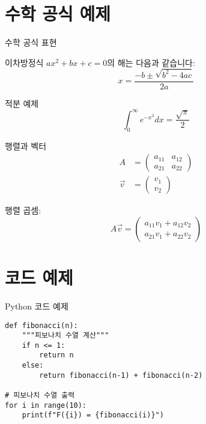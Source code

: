 \documentclass[aspectratio=169]{beamer}
\begin{document}
\section{수학 공식 예제}

\begin{frame}{수학 공식 표현}
    \begin{block}{이차방정식}
        $ax^2 + bx + c = 0$의 해는 다음과 같습니다:
        \[x = \frac{-b \pm \sqrt{b^2 - 4ac}}{2a}\]
    \end{block}
    
    \pause
    
    \begin{block}{적분 예제}
        \[\int_{0}^{\infty} e^{-x^2} dx = \frac{\sqrt{\pi}}{2}\]
    \end{block}
\end{frame}

\begin{frame}{행렬과 벡터}
    \begin{align}
        A &= \begin{pmatrix}
            a_{11} & a_{12} \\
            a_{21} & a_{22}
        \end{pmatrix} \\
        \vec{v} &= \begin{pmatrix}
            v_1 \\
            v_2
        \end{pmatrix}
    \end{align}
    
    \pause
    
    행렬 곱셈:
    \[A\vec{v} = \begin{pmatrix}
        a_{11}v_1 + a_{12}v_2 \\
        a_{21}v_1 + a_{22}v_2
    \end{pmatrix}\]
\end{frame}

\section{코드 예제}

\begin{frame}[fragile]{Python 코드 예제}
    \begin{lstlisting}
def fibonacci(n):
    """피보나치 수열 계산"""
    if n <= 1:
        return n
    else:
        return fibonacci(n-1) + fibonacci(n-2)

# 피보나치 수열 출력
for i in range(10):
    print(f"F({i}) = {fibonacci(i)}")
    \end{lstlisting}
\end{frame}
\end{document}
